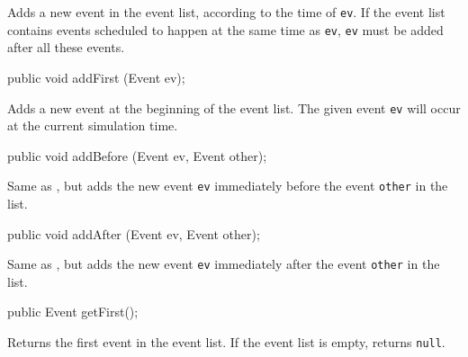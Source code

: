  \begin{tabb}  Adds a new event in the event list, according to
  the time of {\tt ev}.
  If the event list contains events scheduled to happen at the same time as
  {\tt ev}, {\tt ev} must be added after all these events.
 \end{tabb}
\begin{htmlonly}
\end{htmlonly}
\begin{code}

   public void addFirst (Event ev);
\end{code}
 \begin{tabb}  Adds a new event at the beginning of the event list.  The given
   event {\tt ev} will occur at the current simulation time.
 \end{tabb}
\begin{htmlonly}
\end{htmlonly}
\begin{code}

   public void addBefore (Event ev, Event other);
\end{code}
 \begin{tabb}  Same as , but adds the new event {\tt ev}
  immediately before the event {\tt other} in the list.
 \end{tabb}
\begin{htmlonly}
\end{htmlonly}
\begin{code}

   public void addAfter (Event ev, Event other);
\end{code}
 \begin{tabb}  Same as , but adds the new event {\tt ev}
  immediately after the event {\tt other} in the list.
 \end{tabb}
\begin{htmlonly}
\end{htmlonly}
\begin{code}

   public Event getFirst();
\end{code}
 \begin{tabb} Returns the first event in the event list.
 If the event list is empty, returns {\tt null}.
 \end{tabb}
